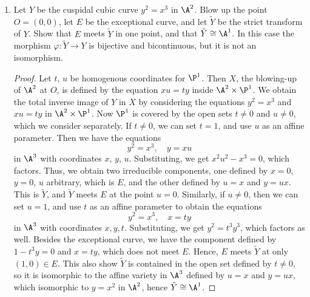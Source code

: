\documentclass[a4paper]{article}
\begin{document}
\begin{enumerate} [label=\textbf{\arabic*.}, leftmargin=0cm]
\item[\textbf{10.}] Let $Y$ be the cuspidal cubic curve $y^2 = x^3$ in $\A^2$. Blow up the point $O = (0, 0)$, let $E$ be the exceptional curve, and let $\tilde{Y}$ be the strict transform of $Y$. Show that $E$ meets $\tilde{Y}$ in one point, and that $\tilde{Y} \cong \A^1$. In this case the morphism $\varphi : \tilde{Y} \to Y$ is bijective and bicontinuous, but it is not an isomorphism.

\begin{proof}
    Let $t$, $u$ be homogenous coordinates for $\P^1$.
    Then $X$, the blowing-up of $\A^2$ at $O$, is defined by the equation $xu = ty$ inside $\A^2 \times \P^1$.
    We obtain the total inverse image of $Y$ in $X$ by considering the equations $y^2 = x^3$ and $xu = ty$ in $\A^2 \times \P^1$.
    Now $\P^1$ is covered by the open sets $t \neq 0$ and $u \neq 0$, which we consider separately. If $t \neq 0$, we can set $t = 1$, and use $u$ as an affine parameter. Then we have the equations
    \begin{equation*}
        y^2 = x^3, \quad y = xu
    \end{equation*}
    in $\A^3$ with coordinates $x$, $y$, $u$. Substituting, we get $x^2u^2 - x^3 = 0$, which factors. Thus, we obtain two irreducible components, one defined by $x = 0$, $y = 0$, $u$ arbitrary, which is $E$, and the other defined by $u = x$ and $y = ux$.
    This is $\tilde{Y}$, and $\tilde{Y}$ meets $E$ at the point $u = 0$.
    Similarly, if $u \neq 0$, then we can set $u = 1$, and use $t$ as an affine parameter to obtain the equations
    \begin{equation*}
        y^2 = x^3, \quad x = ty
    \end{equation*}
    in $\A^3$ with coordinates $x, y, t$.
    Substituting, we get $y^2 = t^3 y^3$, which factors as well.
    Besides the exceptional curve, we have the component defined by $1 - t^3 y = 0$ and $x = ty$, which does not meet $E$. Hence, $E$ meets $\tilde{Y}$ at only $(1, 0) \in E$.
    This also show $\tilde{Y}$ is contained in the open set defined by $t \neq 0$, so it is isomorphic to the affine variety in $\A^3$ defined by $u = x$ and $y = ux$, which isomorphic to $y = x^2$ in $\A^2$, hence $\tilde{Y} \cong \A^1$.
\end{proof}

\end{enumerate}
\end{document}

